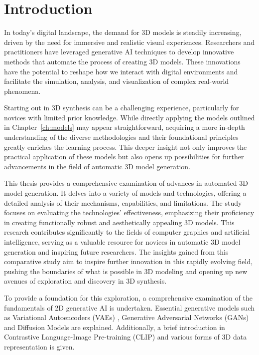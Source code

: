 \chapter{Introduction}
\label{ch:introduction}

In today's digital landscape, the demand for 3D models is steadily increasing, driven by the need for immersive and realistic visual experiences. Researchers and practitioners have leveraged generative AI techniques to develop innovative methods that automate the process of creating 3D models. These innovations have the potential to reshape how we interact with digital environments and facilitate the simulation, analysis, and visualization of complex real-world phenomena.

Starting out in 3D synthesis can be a challenging experience, particularly for novices with limited prior knowledge. While directly applying the models outlined in Chapter~\ref{ch:models} may appear straightforward, acquiring a more in-depth understanding of the diverse methodologies and their foundational principles greatly enriches the learning process. This deeper insight not only improves the practical application of these models but also opens up possibilities for further advancements in the field of automatic 3D model generation.

This thesis provides a comprehensive examination of advances in automated 3D model generation. It delves into a variety of models and technologies, offering a detailed analysis of their mechanisms, capabilities, and limitations. The study focuses on evaluating the technologies' effectiveness, emphasizing their proficiency in creating functionally robust and aesthetically appealing 3D models. This research contributes significantly to the fields of computer graphics and artificial intelligence, serving as a valuable resource for novices in automatic 3D model generation and inspiring future researchers. The insights gained from this comparative study aim to inspire further innovation in this rapidly evolving field, pushing the boundaries of what is possible in 3D modeling and opening up new avenues of exploration and discovery in 3D synthesis.

To provide a foundation for this exploration, a comprehensive examination of the fundamentals of 2D generative AI is undertaken.  Essential generative models such as Variational Autoencoders (VAEs) \citep{kingmaVAE,rezendeVAE}, Generative Adversarial Networks (GANs) \citep{goodfellowGAN} and Diffusion Models \citep{yangdiffusionSummary,hoDDPMs, sohlDDPM} are explained. Additionally, a brief introduction in Contrastive Language-Image Pre-training (CLIP) \citep{radfordCLIP} and various forms of 3D data representation is given.

